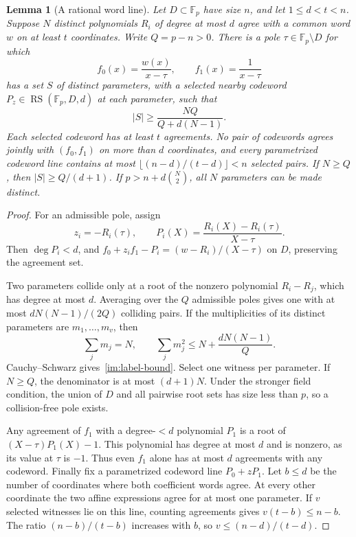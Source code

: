 \documentclass[11pt,letterpaper]{article}
\newtheorem{lemma}[theorem]{Lemma}
\theoremstyle{definition}
\theoremstyle{remark}
\newcommand{\F}{\mathbb F}
\newcommand{\RS}{\operatorname{RS}}
\begin{document}
\begin{lemma}[A rational word line]\label{im:pencil}
Let $D\subset\F_p$ have size $n$, and let $1\le d<t<n$.
Suppose $N$ distinct polynomials $R_i$ of degree at most $d$ agree with
a common word $w$ on at least $t$ coordinates. Write $Q=p-n>0$.
There is a pole $\tau\in\F_p\setminus D$ for which
\[
 f_0(x)=\frac{w(x)}{x-\tau},\qquad f_1(x)=\frac1{x-\tau}
\]
has a set $S$ of distinct parameters, with a selected nearby codeword
$P_z\in\RS(\F_p,D,d)$ at each parameter, such that
\begin{equation}\label{im:label-bound}
 |S|\ge\frac{NQ}{Q+d(N-1)}.
\end{equation}
Each selected codeword has at least $t$ agreements. No pair of codewords
agrees jointly with $(f_0,f_1)$ on more than $d$ coordinates, and every
parametrized codeword line contains at most
$\lfloor(n-d)/(t-d)\rfloor<n$ selected pairs.
If $N\ge Q$, then $|S|\ge Q/(d+1)$. If
$p>n+d\binom N2$, all $N$ parameters can be made distinct.
\end{lemma}
\begin{proof}
For an admissible pole, assign
\[
 z_i=-R_i(\tau),\qquad
 P_i(X)=\frac{R_i(X)-R_i(\tau)}{X-\tau}.
\]
Then $\deg P_i<d$, and
$f_0+z_if_1-P_i=(w-R_i)/(X-\tau)$ on $D$, preserving the agreement set.

Two parameters collide only at a root of the nonzero polynomial $R_i-R_j$,
which has degree at most $d$. Averaging over the $Q$ admissible poles gives
one with at most $dN(N-1)/(2Q)$ colliding pairs. If the multiplicities of
its distinct parameters are $m_1,\ldots,m_v$, then
\[
 \sum_jm_j=N,\qquad \sum_jm_j^2\le N+\frac{dN(N-1)}Q.
\]
Cauchy--Schwarz gives~\eqref{im:label-bound}. Select one witness per
parameter. If $N\ge Q$, the denominator is at most $(d+1)N$.
Under the stronger field condition, the union of $D$ and all pairwise
root sets has size less than $p$, so a collision-free pole exists.

Any agreement of $f_1$ with a degree-$<d$ polynomial $P_1$ is a root of
$(X-\tau)P_1(X)-1$. This polynomial has degree at most $d$ and is nonzero,
as its value at $\tau$ is $-1$. Thus even $f_1$ alone has at most $d$
agreements with any codeword.
Finally fix a parametrized codeword line $P_0+zP_1$. Let $b\le d$ be the
number of coordinates where both coefficient words agree. At every other
coordinate the two affine expressions agree for at most one parameter.
If $v$ selected witnesses lie on this line, counting agreements gives
$v(t-b)\le n-b$. The ratio $(n-b)/(t-b)$ increases with $b$, so
$v\le(n-d)/(t-d)$.
\end{proof}
\end{document}
